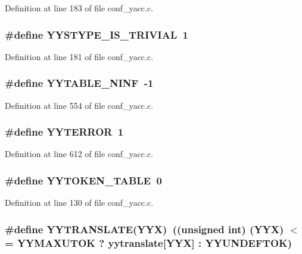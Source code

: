 Definition at line 183 of file conf\_\-yacc.c.
\subsubsection[{YYSTYPE\_\-IS\_\-TRIVIAL}]{\setlength{\rightskip}{0pt plus 5cm}\#define YYSTYPE\_\-IS\_\-TRIVIAL~1}\label{conf__yacc_8c_a2e3dbf169c5ee24cf6af37c61cf3995d}


Definition at line 181 of file conf\_\-yacc.c.
\subsubsection[{YYTABLE\_\-NINF}]{\setlength{\rightskip}{0pt plus 5cm}\#define YYTABLE\_\-NINF~-\/1}\label{conf__yacc_8c_a504faa93b92f37fcc147f68e8d111a1d}


Definition at line 554 of file conf\_\-yacc.c.
\subsubsection[{YYTERROR}]{\setlength{\rightskip}{0pt plus 5cm}\#define YYTERROR~1}\label{conf__yacc_8c_ad2b58b1851184ddb3b60fede50bc7946}


Definition at line 612 of file conf\_\-yacc.c.
\subsubsection[{YYTOKEN\_\-TABLE}]{\setlength{\rightskip}{0pt plus 5cm}\#define YYTOKEN\_\-TABLE~0}\label{conf__yacc_8c_a3499e31aa832edc82b632ae811286a4b}


Definition at line 130 of file conf\_\-yacc.c.
\subsubsection[{YYTRANSLATE}]{\setlength{\rightskip}{0pt plus 5cm}\#define YYTRANSLATE(YYX)~((unsigned int) (YYX) $<$= YYMAXUTOK ? yytranslate[YYX] : YYUNDEFTOK)}\label{conf__yacc_8c_aad19ee88e33c02c4e720b28f78249bd7}


